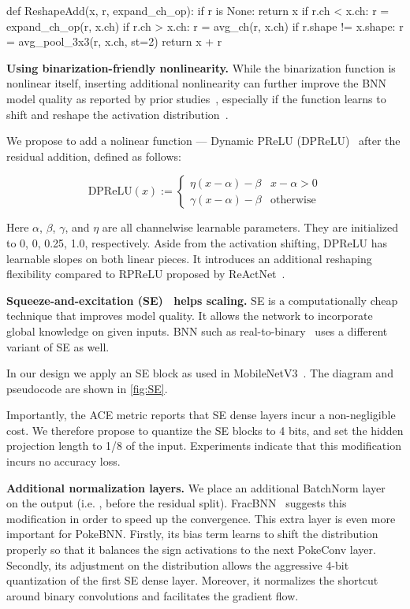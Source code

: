 \begin{python}
def ReshapeAdd(x, r, expand_ch_op): if r is None: return x if r.ch < x.ch: r = expand_ch_op(r, x.ch) if r.ch > x.ch: r = avg_ch(r, x.ch) if r.shape != x.shape: r = avg_pool_3x3(r, x.ch, st=2) return x + r
\end{python}

\textbf{Using binarization-friendly nonlinearity.} While the binarization function is nonlinear itself, inserting additional nonlinearity can further improve the BNN model quality as reported by prior studies~\cite{Bulat2019pose, Liu2020reactnet}, especially if the function learns to shift and reshape the activation distribution~\cite{Liu2020reactnet}.

We propose to add a nolinear function --- Dynamic PReLU (DPReLU)~\cite{ngoc2020dprelu} after the residual addition, defined as follows:

\begin{equation}
    \text{DPReLU}(x) := \left\{\begin{matrix} \eta(x-\alpha)-\beta & x-\alpha>0 \\ \gamma(x-\alpha)-\beta & \text{otherwise} \end{matrix}\right.
\label{eq:actfunc}
\end{equation}

Here $\alpha$, $\beta$, $\gamma$, and $\eta$ are all channelwise learnable parameters. They are initialized to 0, 0, 0.25, 1.0, respectively. Aside from the activation shifting, DPReLU has learnable slopes on both linear pieces. It introduces an additional reshaping flexibility compared to RPReLU proposed by ReActNet~\cite{Liu2020reactnet}. 

\textbf{Squeeze-and-excitation (SE)~\cite{hu2018se} helps scaling.} SE is a computationally cheap technique that improves model quality. It allows the network to incorporate global knowledge on given inputs. BNN such as real-to-binary~\cite{Martinez2020realtobinary} uses a different variant of SE as well. 

In our design we apply an SE block as used in MobileNetV3~\cite{howard2019mobilenetv3}. The diagram and pseudocode are shown in \ref{fig:SE}.

Importantly, the ACE metric reports that SE dense layers incur a non-negligible cost. We therefore propose to quantize the SE blocks to 4 bits, and set the hidden projection length to 1/8 of the input. Experiments indicate that this modification incurs no accuracy loss.

\textbf{Additional normalization layers.} We place an additional BatchNorm layer~\cite{ioffe2015batchnorm} on the output (i.e. , before the residual split). FracBNN~\cite{zhang2021fracbnn} suggests this modification in order to speed up the convergence. This extra layer is even more important for PokeBNN. Firstly, its bias term learns to shift the distribution properly so that it balances the sign activations to the next PokeConv layer. Secondly, its adjustment on the distribution allows the aggressive 4-bit quantization of the first SE dense layer. Moreover, it normalizes the shortcut around binary convolutions and facilitates the gradient flow.

